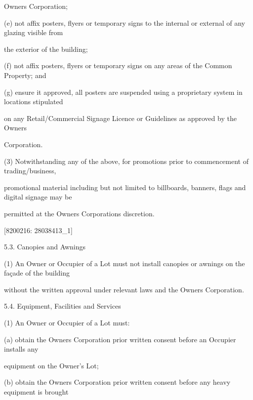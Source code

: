 \documentclass{article}
\begin{document}
{\fontsize{10.02}{1}Owners Corporation; }

{\fontsize{9.962}{1}(e) not affix posters, flyers or temporary signs to the internal or external of any glazing visible from }

{\fontsize{10.02}{1}the exterior of the building; }

{\fontsize{9.962}{1}(f) not affix posters, flyers or temporary signs on any areas of the Common Property; and }

{\fontsize{9.962}{1}(g) ensure it approved, all posters are suspended using a proprietary system in locations stipulated }

{\fontsize{10.02}{1}on any Retail/Commercial Signage Licence or Guidelines as approved by the Owners }

{\fontsize{10.02}{1}Corporation. }

{\fontsize{9.962}{1}(3) Notwithstanding any of the above, for promotions prior to commencement of trading/business, }

{\fontsize{10.02}{1}promotional material including but not limited to billboards, banners, flags and digital signage may be }

{\fontsize{10.02}{1}permitted at the Owners Corporations discretion. }

\newpage
















{\fontsize{7.02}{1}[8200216: 28038413\_1] }

{\fontsize{9.99}{1}5.3. Canopies and Awnings }

{\fontsize{9.962}{1}(1) An Owner or Occupier of a Lot must not install canopies or awnings on the façade of the building }

{\fontsize{10.02}{1}without the written approval under relevant laws and the Owners Corporation. }

{\fontsize{9.99}{1}5.4. Equipment, Facilities and Services }

{\fontsize{9.962}{1}(1) An Owner or Occupier of a Lot must: }

{\fontsize{9.962}{1}(a) obtain the Owners Corporation prior written consent before an Occupier installs any }

{\fontsize{10.02}{1}equipment on the Owner’s Lot; }

{\fontsize{9.962}{1}(b) obtain the Owners Corporation prior written consent before any heavy equipment is brought }
\end{document}
